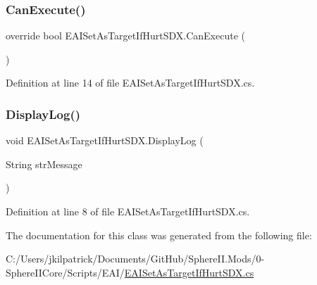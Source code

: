 \subsubsection{\texorpdfstring{CanExecute()}{CanExecute()}}
{\footnotesize\ttfamily override bool E\+A\+I\+Set\+As\+Target\+If\+Hurt\+S\+D\+X.\+Can\+Execute (\begin{DoxyParamCaption}{ }\end{DoxyParamCaption})}



Definition at line 14 of file E\+A\+I\+Set\+As\+Target\+If\+Hurt\+S\+D\+X.\+cs.

\mbox{\label{class_e_a_i_set_as_target_if_hurt_s_d_x_a7a96f5a8642f0efafd0845e8fb5835d5}} 
\subsubsection{\texorpdfstring{DisplayLog()}{DisplayLog()}}
{\footnotesize\ttfamily void E\+A\+I\+Set\+As\+Target\+If\+Hurt\+S\+D\+X.\+Display\+Log (\begin{DoxyParamCaption}\item[{String}]{str\+Message }\end{DoxyParamCaption})}



Definition at line 8 of file E\+A\+I\+Set\+As\+Target\+If\+Hurt\+S\+D\+X.\+cs.



The documentation for this class was generated from the following file\+:\begin{DoxyCompactItemize}
\item 
C\+:/\+Users/jkilpatrick/\+Documents/\+Git\+Hub/\+Sphere\+I\+I.\+Mods/0-\/\+Sphere\+I\+I\+Core/\+Scripts/\+E\+A\+I/\mbox{\hyperlink{_e_a_i_set_as_target_if_hurt_s_d_x_8cs}{E\+A\+I\+Set\+As\+Target\+If\+Hurt\+S\+D\+X.\+cs}}\end{DoxyCompactItemize}

